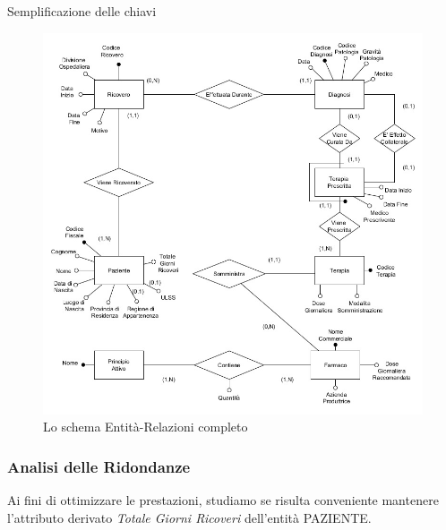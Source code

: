 \documentclass{article}
\begin{document}
Semplificazione delle chiavi







\begin{figure}[H] %
	\centering
	\includegraphics[width=\linewidth]{schema2}
	\caption{Lo schema Entità-Relazioni completo}
	\label{schema_ER_ristrutturato}
\end{figure}



\clearpage
\subsubsection{Analisi delle Ridondanze}

Ai fini di ottimizzare le prestazioni, studiamo se risulta conveniente mantenere l'attributo derivato \textit{Totale Giorni Ricoveri} dell'entità PAZIENTE.
\end{document}

